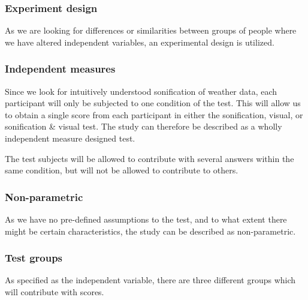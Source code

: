 
\subsubsection{Experiment design} %
\label{ssub:experiment_design}

As we are looking for differences or similarities between groups of people where we have altered independent variables, an experimental design is utilized.


\subsubsection{Independent measures} %
\label{ssub:independent_measures}

Since we look for intuitively understood sonification of weather data, each participant will only be subjected to one condition of the test. 
This will allow us to obtain a single score from each participant in either the sonification, visual, or sonification \& visual test. The study can therefore be described as a wholly independent measure designed test.

The test subjects will be allowed to contribute with several answers within the same condition, but will not be allowed to contribute to others.


\subsubsection{Non-parametric} %
\label{ssub:non_parametric}

As we have no pre-defined assumptions to the test, and to what extent there might be certain characteristics, the study can be described as non-parametric.


\subsubsection{Test groups} %
\label{ssub:test_groups}

As specified as the independent variable, there are three different groups which will contribute with scores.


